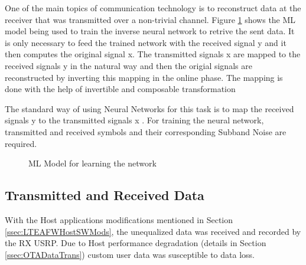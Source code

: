 One of the main topics of communication technology is to reconstruct data at the
receiver that was transmitted over a non-trivial channel. Figure \ref{fig:MLModel} shows the ML model being used to train the inverse neural network to retrive the sent data. It is only necessary to feed the trained network with the received signal y and it then computes the original signal x. The transmitted signals x are mapped to the received signals y in the natural way and then the origial signals are reconstructed by inverting this mapping in the online phase. The mapping is done with the help of invertible and composable transformation 


The standard way of using Neural Networks for this task is to map the received signals y to the transmitted signals x \cite{JMMLINN}. For training the neural network, transmitted and received symbols and their corresponding Subband Noise are required.

\begin{center}
    \begin{figure}[H]
    \caption{ML Model for learning the network}
    \label{fig:MLModel}
    \end{figure}
\end{center}

\subsection{Transmitted and Received Data}\label{ssec:XYPairs}

With the Host applications modifications mentioned in Section \ref{ssec:LTEAFWHostSWMods}, the unequalized data was received and recorded by the RX USRP. Due to Host performance degradation (details in Section \ref{ssec:OTADataTrans}) custom user data was susceptible to data loss.

